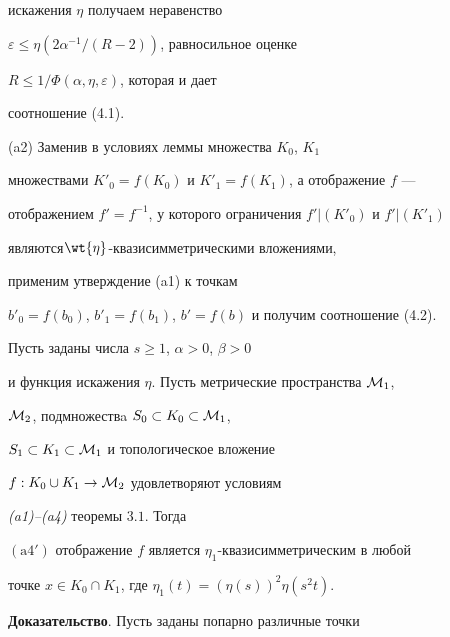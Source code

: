 \begin{pf}
искажения $\eta$ получаем неравенство 


$\varepsilon \leq \eta(2\alpha^{-1}/(R-2))$, равносильное оценке 


$R \leq 1/\Phi(\alpha, \eta, \varepsilon)$, которая и дает


соотношение (4.1).





(a2) Заменив в условиях леммы множества $K_0$, $K_1$ 


множествами $K'_0=f(K_0)$ и $K'_1=f(K_1)$, а отображение $f$ --- 


отображением $f'=f^{-1}$, у которого ограничения $f'|(K'_0)$ и $f'|(K'_1)$ 


являются\linebreak $\wt{\eta}$-{}квазисимметрическими вложениями, 


применим утверждение (a1) к точкам 


$b'_0=f(b_0)$, $b'_1=f(b_1)$, $b'=f(b)$ и получим соотношение (4.2).


\end{pf}








\begin{lems}


Пусть заданы числа $s\geq 1$, $\alpha >0$, $\beta >0$ 


и функция искажения $\eta$. Пусть метрические пространства ${\cal M}_1$, 


${\cal M}_2$, подмножествa $S_0 \subset K_0 \subset {\cal M}_1$, 


$S_1 \subset K_1 \subset {\cal M}_1$ и топологическое вложение 


$f: K_0\cup K_1 \to {\cal M}_2$ удовлетворяют условиям 


{\em (a1)--(a4)} теоремы $3.1$. Тогда 





$(\mathrm a4')$ отображение $f$ является $\eta_1$-{}квазисимметрическим в любой 


точке $x\in K_0\cap K_1$, где $\eta_1(t)=(\eta(s))^2\eta(s^2t)$.


\end{lems}








{\bf Доказательство}. Пусть заданы попарно различные точки 


